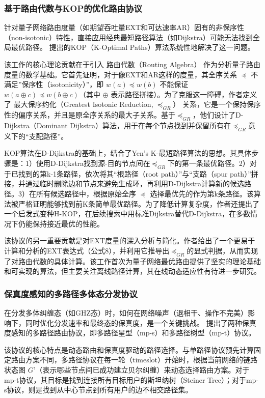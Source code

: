 \subsubsection{基于路由代数与KOP的优化路由协议}
针对量子网络路由度量（如期望吞吐量EXT和可达速率AR）固有的非保序性（non-isotonic）特性，直接应用经典最短路径算法（如Dijkstra）可能无法找到全局最优路径。\cite{Wang2025} 提出的KOP（K-Optimal Paths）算法系统性地解决了这一问题。

该工作的核心理论贡献在于引入 路由代数（Routing Algebra） 作为分析量子路由度量的数学基础。它首先证明，对于像EXT和AR这样的度量，其全序关系 $\preceq$ 不满足”保序性（isotonicity）”，即 $w(a) \preceq w(b)$ 不能保证 $w(a \oplus c) \preceq w(b \oplus c)$（其中 $\oplus$ 表示路径拼接）。为了克服这一障碍，作者定义了 最大保序约化（Greatest Isotonic Reduction, $\preceq_{GR}$） 关系，它是一个保持保序性的偏序关系，并且是原全序关系的最大子关系。基于$\preceq_{GR}$，他们设计了D-Dijkstra（Dominant Dijkstra）算法，用于在每个节点找到并保留所有在$\preceq_{GR}$意义下的“支配路径”。

KOP算法在D-Dijkstra的基础上，结合了Yen’s K-最短路径算法的思想。其具体步骤是：1）使用D-Dijkstra找到源-目的节点间在$\preceq_{GR}$下的第一条最优路径。2）对于已找到的第k-1条路径，依次将其“根路径（root path）”与“支路（spur path）”拼接，并通过临时删除边和节点来避免生成环，再利用D-Dijkstra计算新的候选路径。3）在所有候选路径中，根据原始全序 $\preceq$ 选择最优先的作为第k条路径。该算法被严格证明能够找到前K条简单最优路径。为了降低计算复杂度，作者还提出了一个启发式变种H-KOP，在后续搜索中用标准Dijkstra替代D-Dijkstra，在多数情况下仍能保持接近最优的性能。

该协议的另一重要贡献是对EXT度量的深入分析与简化。作者给出了一个更易于计算和分析的EXT表达式（公式8），并利用它推导出$\preceq_{GR}$的显式判据，从而实现了对路由代数的具体计算。该工作首次为量子网络最优路由提供了坚实的理论基础和可实现的算法，但主要关注离线路径计算，其在线动态适应性有待进一步研究。

\subsubsection{保真度感知的多路径多体态分发协议}
在分发多体纠缠态（如GHZ态）时，如何在网络噪声（退相干、操作不完美）影响下，同时优化分发速率和最终态的保真度，是一个关键挑战。\cite{Sutcliffe2025} 提出了两种保真度感知的多路径路由协议，即多路径星型（mp-s）和多路径树型（mp-t）协议。

该协议的核心特点是动态路由和保真度驱动的路径选择。与单路径协议预先计算固定路由方案不同，多路径协议在每一轮（timeslot）开始时，根据当前网络的链路状态图 $G’$（表示哪些节点间已成功建立贝尔纠缠）来动态选择路由方案。对于mp-t协议，其目标是找到连接所有目标用户的斯坦纳树（Steiner Tree）；对于mp-s协议，则是找到从中心节点到所有用户的边不相交路径集。

